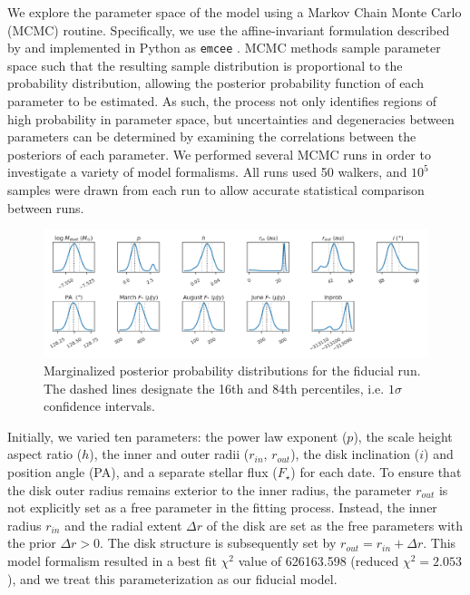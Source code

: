 \documentclass[12pt,oneside]{article}
\begin{document}
We explore the parameter space of the model using a Markov Chain Monte Carlo (MCMC) routine. 
Specifically, we use the affine-invariant formulation described by \cite{goodmanweare10} and implemented in Python as \texttt{emcee} \citep{foreman-mackey13}.  
MCMC methods sample parameter space such that the resulting sample distribution is proportional to the probability distribution, allowing the posterior probability function of each parameter to be estimated. 
As such, the process not only identifies regions of high probability in parameter space, but uncertainties and degeneracies between parameters can be determined by examining the correlations between the posteriors of each parameter. 
We performed several MCMC runs in order to investigate a variety of model formalisms. 
All runs used 50 walkers, and $10^5$ samples were drawn from each run to allow accurate statistical comparison between runs.


\begin{figure}
  \centering
  \includegraphics[width=\linewidth]{figures/fiducial_kde}
  \caption{Marginalized posterior probability distributions for the fiducial run. The dashed lines designate the 16th and 84th percentiles, i.e. $1\sigma$ confidence intervals.}
  \label{fig: kde}
\end{figure}

Initially, we varied ten parameters: the power law exponent ($p$), the scale height aspect ratio ($h$), the inner and outer radii ($r_{in}$, $r_{out}$), the disk inclination  ($i$) and position angle (PA), and a separate stellar flux ($F_\star$) for each date. 
To ensure that the disk outer radius remains exterior to the inner radius, the parameter $r_{out}$ is not explicitly set as a free parameter in the fitting process. 
Instead, the inner radius $r_{in}$  and the radial extent $\Delta r$ of the disk are set as the free parameters with the prior $\Delta r > 0$. 
The disk structure is subsequently set by $r_{out} = r_{in} + \Delta r$.
This model formalism resulted in a best fit $\chi^2$ value of 626163.598 (reduced $\chi^2=2.053$), and we treat this parameterization as our fiducial model.
\end{document}
